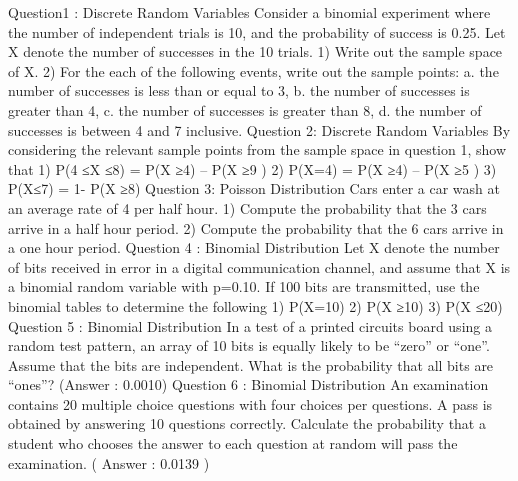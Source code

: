 Question1 : Discrete Random Variables
Consider a binomial experiment where the number of independent trials is 10, and the probability of success is 0.25. Let X denote the number of successes in the 10 trials.
1)	Write out the sample space of X.
2)	For the each of the following events, write out the sample points:
a.	the number of successes is less than or equal to 3,
b.	the number of successes is greater than 4, 
c.	the number of successes is greater than 8, 
d.	the number of successes is between 4 and 7 inclusive.
Question 2: Discrete Random Variables
By considering the relevant sample points from the sample space in question 1, show that 
1)	P(4 ≤X ≤8) = P(X ≥4) – P(X ≥9 )
2)	P(X=4) = P(X ≥4) – P(X ≥5 )
3)	P(X≤7) = 1- P(X ≥8)
Question 3:  Poisson Distribution
Cars enter a car wash at an average rate of 4 per half hour. 
1)	Compute the probability that the 3 cars arrive in a half hour period.
2)	Compute the probability that the 6 cars arrive in a one hour period.
Question 4 : Binomial Distribution
Let X denote the number of bits received in error in a digital communication channel, and assume that X is a binomial random variable with p=0.10. If 100 bits are transmitted, use the binomial tables to determine the following
1)	P(X=10)
2)	P(X ≥10)
3)	P(X ≤20)
Question 5 : Binomial Distribution
In a test of a printed circuits board using a random test pattern,  an array of 10 bits is equally likely to be “zero” or “one”. Assume that the bits are independent. 
What is the probability that all bits are “ones”?  (Answer : 0.0010)
Question 6 : Binomial Distribution
An examination contains 20 multiple choice questions with four choices per questions. A pass is obtained by answering  10 questions correctly. Calculate the probability that a student who chooses the answer to each question at random will pass the examination.  ( Answer : 0.0139 )

